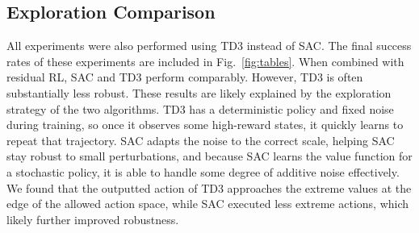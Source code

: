 \subsection{Exploration Comparison}
All experiments were also performed using TD3 instead of SAC. 
The final success rates of these experiments are included in Fig.~\ref{fig:tables}. 
When combined with residual RL, SAC and TD3 perform comparably. 
However, TD3 is often substantially less robust.
These results are likely explained by the exploration strategy of the two algorithms. 
TD3 has a deterministic policy and fixed noise during training, so once it observes some high-reward states, it quickly learns to repeat that trajectory. 
SAC adapts the noise to the correct scale, helping SAC stay robust to small perturbations, and because SAC learns the value function for a stochastic policy, it is able to handle some degree of additive noise effectively.
We found that the outputted action of TD3 approaches the extreme values at the edge of the allowed action space, while SAC executed less extreme actions, which likely further improved robustness.


